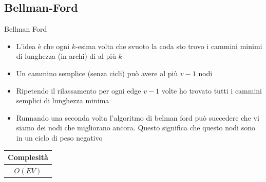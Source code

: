 \subsection{Bellman-Ford}\label{Bellman ford}
\begin{algoritmo}{Bellman Ford}
	\begin{algorithm}[H]
		\vskip3mm
		\caption{Bellman-Ford algorithm}
		\vskip3mm



	\end{algorithm}
\end{algoritmo}
\begin{itemize}
	\item L'idea è che ogni $ k $-esima volta che svuoto la coda sto trovo i cammini minimi di lunghezza (in archi) di al più $ k $
	\item Un cammino semplice (senza cicli) può avere al più $ v-1 $ nodi
	\item Ripetendo il rilassamento per ogni edge $ v-1 $ volte ho trovato tutti i cammini semplici di lunghezza minima
	\item Runnando una seconda volta l'algoritmo di belman ford può succedere che vi siamo dei nodi che migliorano ancora. Questo significa che questo nodi sono in un ciclo di peso negativo
\end{itemize}

\begin{center}
	\begin{tabular}{ c }
		\toprule
		Complesità            \\
		\midrule
		$ O\left(E V\right) $ \\
		\bottomrule
	\end{tabular}
\end{center}

